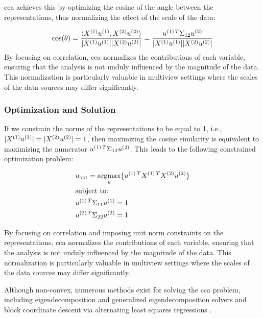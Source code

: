 \acrshort{cca} achieves this by optimizing the cosine of the angle between the representations, thus normalizing the effect of the scale of the data:

\begin{align}
    \label{eq:cosine-similarity}
    \cos(\theta) = \frac{\langle X^{(1)}u^{(1)}, X^{(2)}u^{(2)}\rangle}{|X^{(1)}u^{(1)}| |X^{(2)}u^{(2)}|}= \frac{u^{(1)\,T}\Sigma_{12}u^{(2)}}{|X^{(1)}u^{(1)}| |X^{(2)}u^{(2)}|}
\end{align}
By focusing on correlation, \acrshort{cca} normalizes the contributions of each variable, ensuring that the analysis is not unduly influenced by the magnitude of the data. This normalization is particularly valuable in multiview settings where the scales of the data sources may differ significantly.

\subsubsection{Optimization and Solution}

If we constrain the norms of the representations to be equal to 1, i.e., $|X^{(1)}u^{(1)}|=|X^{(2)}u^{(2)}|=1$, then maximizing the cosine similarity is equivalent to maximizing the numerator $u^{(1)\,T}\Sigma_{12}u^{(2)}$. This leads to the following constrained optimization problem:

\begin{align}
    & u_{\text{opt}}=\underset{u}{\mathrm{argmax}}\{ u^{(1)\,T}X^{(1)\,T}X^{(2)}u^{(2)} \} \\
    & \text{subject to:} \notag                                                                \\
    & u^{(1)\,T}\Sigma_{11}u^{(1)}=1 \notag                                                  \\
    & u^{(2)\,T}\Sigma_{22}u^{(2)}=1 \notag
\end{align}

By focusing on correlation and imposing unit norm constraints on the representations, \acrshort{cca} normalizes the contributions of each variable, ensuring that the analysis is not unduly influenced by the magnitude of the data. This normalization is particularly valuable in multiview settings where the scales of the data sources may differ significantly.

Although non-convex, numerous methods exist for solving the \acrshort{cca} problem, including eigendecomposition and generalized eigendecomposition solvers \citep{uurtio2017tutorial} and block coordinate descent via alternating least squares regressions \citep{golub1995canonical,sun2008least}.

